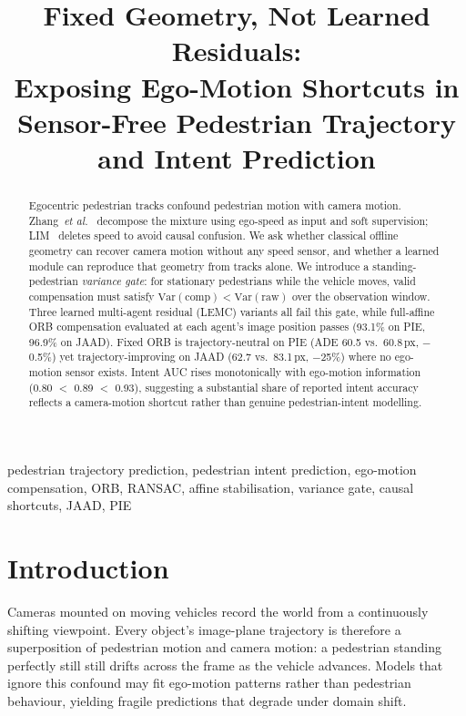 \documentclass[conference]{IEEEtran}
\title{Fixed Geometry, Not Learned Residuals:\\
Exposing Ego-Motion Shortcuts in Sensor-Free Pedestrian Trajectory and Intent Prediction}
\author{\IEEEauthorblockN{Anonymous Authors}
\IEEEauthorblockA{Paper under blind review; remove author block for camera-ready}}
\begin{document}
\maketitle

\begin{abstract}
Egocentric pedestrian tracks confound pedestrian motion with camera motion.
Zhang~\textit{et al.}~\cite{zhang2024decouple} decompose the mixture using ego-speed as input and soft supervision; LIM~\cite{lim2025tits} deletes speed to avoid causal confusion.
We ask whether classical offline geometry can recover camera motion without any speed sensor, and whether a learned module can reproduce that geometry from tracks alone.
We introduce a standing-pedestrian \emph{variance gate}: for stationary pedestrians while the vehicle moves, valid compensation must satisfy $\mathrm{Var}(\text{comp}) < \mathrm{Var}(\text{raw})$ over the observation window.
Three learned multi-agent residual (LEMC) variants all fail this gate, while full-affine ORB compensation evaluated at each agent's image position passes (93.1\% on PIE, 96.9\% on JAAD).
Fixed ORB is trajectory-neutral on PIE (ADE 60.5 vs.\ 60.8\,px, $-$0.5\%) yet trajectory-improving on JAAD (62.7 vs.\ 83.1\,px, $-$25\%) where no ego-motion sensor exists.
Intent AUC rises monotonically with ego-motion information (0.80 $<$ 0.89 $<$ 0.93), suggesting a substantial share of reported intent accuracy reflects a camera-motion shortcut rather than genuine pedestrian-intent modelling.
\end{abstract}

\begin{IEEEkeywords}
pedestrian trajectory prediction, pedestrian intent prediction, ego-motion compensation, ORB, RANSAC, affine stabilisation, variance gate, causal shortcuts, JAAD, PIE
\end{IEEEkeywords}

\section{Introduction}
\label{sec:intro}

Cameras mounted on moving vehicles record the world from a continuously shifting viewpoint.
Every object's image-plane trajectory is therefore a superposition of pedestrian motion and camera motion: a pedestrian standing perfectly still still drifts across the frame as the vehicle advances.
Models that ignore this confound may fit ego-motion patterns rather than pedestrian behaviour, yielding fragile predictions that degrade under domain shift.
\end{document}
